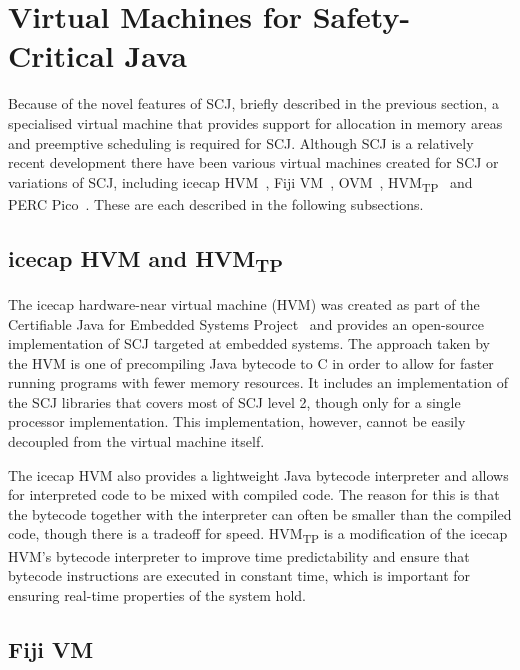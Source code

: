 \documentclass[a4paper,10pt]{report}
\begin{document}
\section{Virtual Machines for Safety-Critical Java}
\label{virtual-machines-section}


Because of the novel features of SCJ, briefly described in the
previous section, a specialised virtual machine that provides support
for allocation in memory areas and preemptive scheduling is required
for SCJ.
Although SCJ is a relatively recent development there have been
various virtual machines created for SCJ or variations of SCJ,
including icecap HVM~\cite{sondergaard2012}, Fiji VM~\cite{pizlo2009},
OVM~\cite{armbruster2007}, HVM\textsubscript{TP}~\cite{luckow2014} and
PERC Pico~\cite{atego2015, richard2010}.
These are each described in the following subsections.

\subsection{icecap HVM and HVM\textsubscript{TP}}

The icecap hardware-near virtual machine (HVM) was created as part of
the Certifiable Java for Embedded Systems Project~\cite{schoeberl2014}
and provides an open-source implementation of SCJ targeted at embedded
systems.
The approach taken by the HVM is one of precompiling Java bytecode to
C in order to allow for faster running programs with fewer memory
resources.
It includes an implementation of the SCJ libraries that covers most of
SCJ level 2, though only for a single processor implementation.
This implementation, however, cannot be easily decoupled from the
virtual machine itself.

The icecap HVM also provides a lightweight Java bytecode interpreter
and allows for interpreted code to be mixed with compiled code.
The reason for this is that the bytecode together with the interpreter
can often be smaller than the compiled code, though there is a
tradeoff for speed.
HVM\textsubscript{TP} is a modification of the icecap HVM's bytecode
interpreter to improve time predictability and ensure that bytecode
instructions are executed in constant time, which is important for
ensuring real-time properties of the system hold.

\subsection{Fiji VM}
\end{document}
